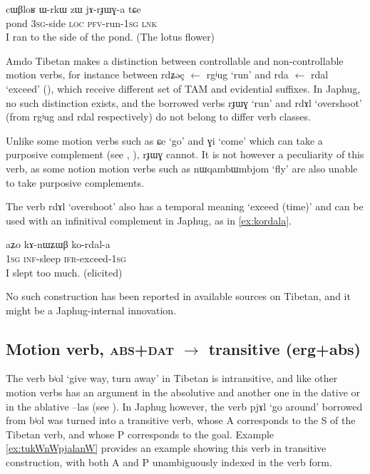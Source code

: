 \documentclass[oldfontcommands,oneside,a4paper,11pt]{article}
\newcommand{\ipa}[1]{{\phon \mbox{#1}}} %
\begin{document}
\begin{exe}
\ex \label{ex:rJWG3}
\gll
\ipa{cɯβloʁ}  	\ipa{ɯ-rkɯ}  	\ipa{zɯ}  	\ipa{jɤ-rɟɯɣ-a}  	\ipa{tɕe}  \\
pond \textsc{3sg}-side \textsc{loc} \textsc{pfv}-run-\textsc{1sg} \textsc{lnk} \\
\glt I ran to the side of the pond. (The lotus flower)
\end{exe}

Amdo Tibetan makes a distinction between controllable and non-controllable motion verbs, for instance between \ipa{rdʑəç} $\leftarrow$ \ipa{rgʲug} `run' and \ipa{rda} $\leftarrow$ \ipa{rdal} `exceed' (\citealt[123:543]{haller04themchen}), which receive different set of TAM and evidential suffixes. In Japhug, no such distinction exists, and  the borrowed verbs \ipa{rɟɯɣ} `run' and \ipa{rdɤl} `overshoot' (from \ipa{rgʲug} and \ipa{rdal} respectively) do not belong to differ verb classes.


Unlike some motion verbs such as \ipa{ɕe} `go' and \ipa{ɣi} `come' which can take a purposive complement (see \citealt{sun12complementation}, \citealt{jacques13harmonization}), \ipa{rɟɯɣ} cannot. It is not however a peculiarity of this verb, as some notion motion verbs such as \ipa{nɯqambɯmbjom} `fly' are also unable to take purposive complements.

The verb \ipa{rdɤl} `overshoot' also has a temporal meaning `exceed (time)' and can be used with an infinitival complement in Japhug, as in \ref{ex:kordala}.

\begin{exe}
\ex \label{ex:kordala}
\gll
\ipa{aʑo}  	\ipa{kɤ-nɯʑɯβ}  	\ipa{ko-rdal-a}  \\
\textsc{1sg} \textsc{inf}-sleep \textsc{ifr}-exceed-\textsc{1sg} \\
\glt I slept too much. (elicited)
\end{exe}

No such construction has been reported in available sources on Tibetan, and it might be a Japhug-internal innovation.

\subsection{Motion verb, \textsc{abs+dat} $\rightarrow$ transitive (erg+abs)}  
The verb \ipa{bʲol} `give way, turn away' in Tibetan is intransitive, and like other motion verbs has an argument in the absolutive and another one in the dative or in the ablative \ipa{--las} (see \citealt[268]{hill10dictionary}). In Japhug however, the verb \ipa{pjɤl} `go around' borrowed from  \ipa{bʲol} was turned into a transitive verb, whose A corresponds to the S of the Tibetan verb, and whose P corresponds to the goal. Example \ref{ex:tukWnWpjalanW} provides an example  showing this verb in transitive construction, with both A and P unambiguously indexed in the verb form.
\end{document}
